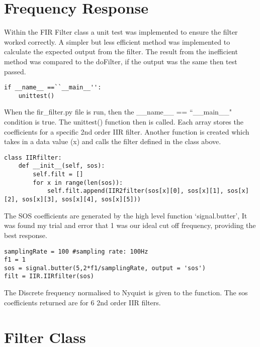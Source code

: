 \documentclass{article}
\begin{document}
\section{Frequency Response}
Within the FIR Filter class a unit test was implemented to ensure the filter worked correctly. A simpler but less efficient method was implemented to calculate the expected output from the filter. The result from the inefficient method was compared to the doFilter, if the output was the same then test passed.

\lstset{language=Python}
\begin{lstlisting}
if __name__ ==``__main__'':
    unittest()
\end{lstlisting}
When the fir\_filter.py file is run, then the \_\_name\_\_ == ``\_\_main\_\_" condition is true. The unittest() function then is called.
Each array stores the coefficients for a specific 2nd order IIR filter. Another function is created which takes in a data value (x) and calls the filter defined in the class above.
\newline 
\lstset{language=Python}
\begin{lstlisting}
class IIRfilter: 
    def __init__(self, sos):
        self.filt = []
        for x in range(len(sos)):
            self.filt.append(IIR2filter(sos[x][0], sos[x][1], sos[x][2], sos[x][3], sos[x][4], sos[x][5]))
\end{lstlisting}
\newline
The SOS coefficients are generated by the high level function `signal.butter', It was found my trial and error that 1 was our ideal cut off frequency, providing the best response.
\newline
\lstset{language=Python}
\begin{lstlisting}
samplingRate = 100 #sampling rate: 100Hz
f1 = 1
sos = signal.butter(5,2*f1/samplingRate, output = 'sos') 
filt = IIR.IIRfilter(sos) 
\end{lstlisting}
\newline
\newline
The Discrete frequency normalised to Nyquist is given to the function. The sos coefficients returned are for 6 2nd order IIR filters. 


\section{Filter Class}
\end{document}
